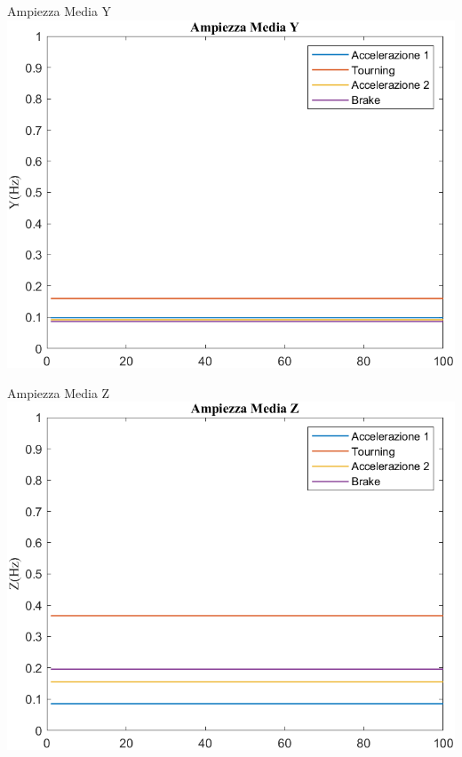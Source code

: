 \documentclass[beamer]{standalone}
\begin{document}
	\begin{frame}{{Ampiezza Media Y}}
		\centering\includegraphics[height=.8\textheight]{figure/Acc/Trasformata/Ampiezza MediaY}
	\end{frame}
	
	\begin{frame}{{Ampiezza Media Z}}
		\centering\includegraphics[height=.8\textheight]{figure/Acc/Trasformata/Ampiezza MediaZ}
	\end{frame}		
\end{document}
